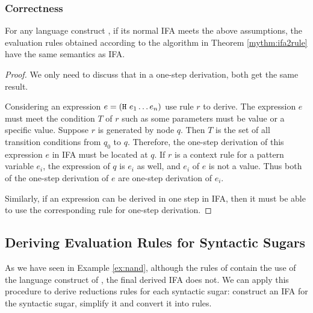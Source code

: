 \subsubsection{Correctness}

\begin{lemma}
    \label{lemma:ifa2rule-correct}
    For any language construct , if its normal IFA meets the above assumptions, the evaluation rules obtained according to the algorithm in Theorem \ref{mythm:ifa2rule} have the same semantics as IFA.
\end{lemma}


\begin{proof}
    We only need to discuss that in a one-step derivation, both get the same result.

    Considering an expression $e=(\mbox{\tt H}~e_1 \ldots e_n)$ use rule $r$ to derive. The expression $e$ must meet the condition $T$ of $r$ such as some parameters must be value or a specific value. Suppose $r$ is generated by node $q$. Then $T$ is the set of all transition conditions from $q_0$ to $q$. Therefore, the one-step derivation of this expression $e$ in IFA must be located at $q$. If $r$ is a context rule for a pattern variable $e_i$, the expression of $q$ is $e_i$ as well, and $e_i$ of $e$ is not a value. Thus both of the one-step derivation of $e$ are one-step derivation of $e_i$.

    Similarly, if an expression can be derived in one step in IFA, then it must be able to use the corresponding rule for one-step derivation.
\end{proof}

\subsection{Deriving Evaluation Rules for Syntactic Sugars}

As we have seen in Example \ref{ex:nand}, although  the rules of  contain the use of the language construct of , the final derived IFA does not. We can apply this procedure to derive reductions rules for each syntactic sugar: construct an  IFA for the  syntactic sugar, simplify it and convert it into rules.

